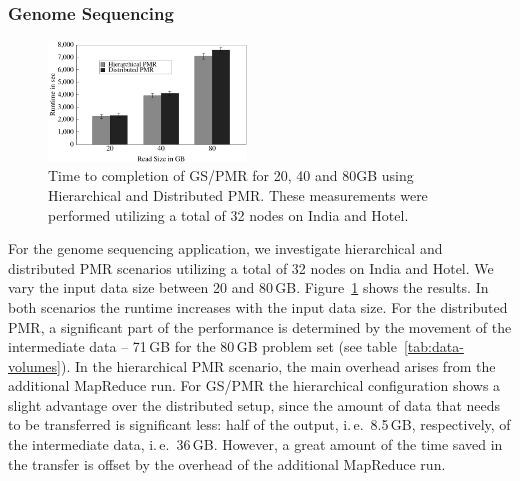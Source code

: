 \documentclass{acm_proc_article-sp}
\newcommand{\upp}{\vspace*{-0.5em}}
\begin{document}
\upp\upp
\subsubsection*{Genome Sequencing}

\begin{figure}[t]
	\centering
		\includegraphics[width=0.47\textwidth]{figures/gs_hihmr_dpmr.pdf}
                \caption{Time to completion of GS/PMR for 20, 40 and
                  80GB using Hierarchical and Distributed PMR. These
                  measurements were performed utilizing a total of 32
                  nodes on India and Hotel. \upp\upp\upp}
\label{fig:gs_hihmr_dpmr}
\end{figure}		

For the genome sequencing application, we investigate hierarchical and
distributed PMR scenarios utilizing a total of 32 nodes on India and
Hotel. We vary the input data size between 20 and 80\,GB.
Figure~\ref{fig:gs_hihmr_dpmr} shows the results. In both scenarios
the runtime increases with the input data size. For the distributed
PMR, a significant part of the performance is determined by the
movement of the intermediate data -- 71\,GB for the 80\,GB problem set
(see table~\ref{tab:data-volumes}). In the hierarchical PMR scenario,
the main overhead arises from the additional MapReduce run. For GS/PMR
the hierarchical configuration shows a slight advantage over the
distributed setup, since the amount of data that needs to be
transferred is significant less: half of the output, i.\,e.\ 8.5\,GB,
respectively, of the intermediate data, i.\,e.\ 36\,GB. However, a
great amount of the time saved in the transfer is offset by the
overhead of the additional MapReduce run.
\end{document}
